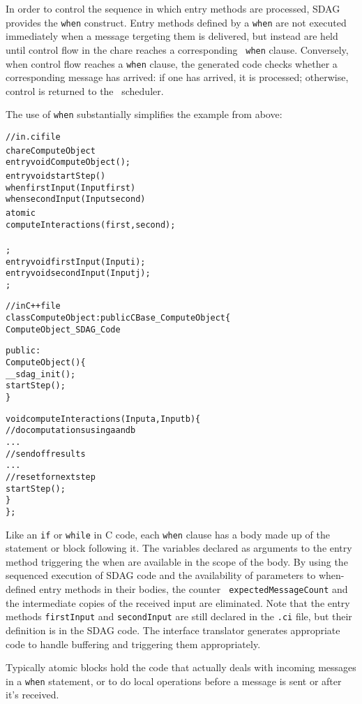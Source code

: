 In order to control the sequence in which entry methods are processed, SDAG
provides the {\tt when} construct. Entry methods defined by a {\tt when} are
not executed immediately when a message tergeting them is delivered, but
instead are held until control flow in the chare reaches a corresponding {\tt
  when} clause. Conversely, when control flow reaches a {\tt when} clause, the
generated code checks whether a corresponding message has arrived: if one has
arrived, it is processed; otherwise, control is returned to the
\charmpp\ scheduler. 

The use of {\tt when} substantially simplifies the example from above:
\begin{center}
\begin{alltt}
// in .ci file
chare ComputeObject {
  entry void ComputeObject();
  entry void startStep() {
    when firstInput(Input first)
      when secondInput(Input second)
        atomic {
          computeInteractions(first, second);
        }
  };
  entry void firstInput(Input i);
  entry void secondInput(Input j);
};

// in C++ file
class ComputeObject : public CBase_ComputeObject \{
  ComputeObject_SDAG_Code

public:
  ComputeObject() \{
    __sdag_init();
    startStep();
  \}

  void computeInteractions(Input a, Input b) \{
    // do computations using a and b
    . . .
    // send off results
    . . .
    // reset for next step
    startStep();
  \}
\};
\end{alltt}
\end{center}
Like an {\tt if} or {\tt while} in C code, each {\tt when} clause has a body
made up of the statement or block following it. The variables declared as
arguments to the entry method triggering the when are available in the scope of
the body. By using the sequenced execution of SDAG code and the availability of
parameters to when-defined entry methods in their bodies, the counter {\tt
  expectedMessageCount} and the intermediate copies of the received input are
eliminated. Note that the entry methods {\tt firstInput} and {\tt secondInput}
are still declared in the {\tt .ci} file, but their definition is in the SDAG
code. The interface translator generates appropriate code to handle buffering
and triggering them appropriately.




 Typically atomic blocks hold
the code that actually deals with incoming messages in a {\tt when} statement,
or to do local operations before a message is sent or after it's received.



